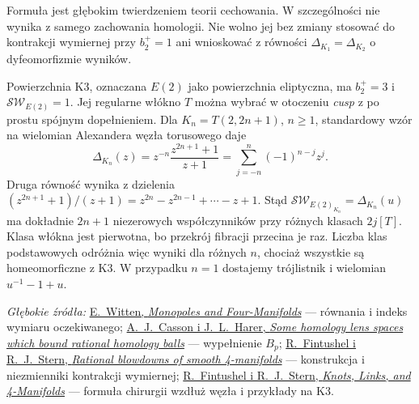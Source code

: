 Formuła jest głębokim twierdzeniem teorii cechowania.
W szczególności nie wynika z samego zachowania homologii.
Nie wolno jej bez zmiany stosować do kontrakcji wymiernej
przy $b_2^+=1$ ani wnioskować z równości
$\Delta_{K_1}=\Delta_{K_2}$ o dyfeomorfizmie wyników.

\begin{przyklad}
\label{prz:ks-k3-cztery}
Powierzchnia K3, oznaczana $E(2)$ jako powierzchnia
eliptyczna, ma $b_2^+=3$ i $\mathcal{SW}_{E(2)}=1$.
Jej regularne włókno $T$ można wybrać w otoczeniu
\emph{cusp} z po prostu spójnym dopełnieniem.
Dla $K_n=T(2,2n+1)$, $n\geq1$, standardowy wzór
na wielomian Alexandera węzła torusowego daje
\[
 \Delta_{K_n}(z)=z^{-n}\frac{z^{2n+1}+1}{z+1}
 =\sum_{j=-n}^{n}(-1)^{n-j}z^j.
\]
Druga równość wynika z dzielenia
$(z^{2n+1}+1)/(z+1)=z^{2n}-z^{2n-1}+\cdots-z+1$.
Stąd $\mathcal{SW}_{E(2)_{K_n}}=\Delta_{K_n}(u)$
ma dokładnie $2n+1$ niezerowych współczynników
przy różnych klasach $2j[T]$. Klasa włókna jest
pierwotna, bo przekrój fibracji przecina je raz.
Liczba klas podstawowych odróżnia więc wyniki
dla różnych $n$, chociaż wszystkie są homeomorficzne
z K3. W przypadku $n=1$ dostajemy trójlistnik
i wielomian $u^{-1}-1+u$.
\end{przyklad}

\par\smallskip
{\footnotesize\noindent\emph{Głębokie źródła:}
\href{https://arxiv.org/abs/hep-th/9411102}
{E.\ Witten, \emph{Monopoles and Four-Manifolds}} ---
równania i indeks wymiaru oczekiwanego;
\href{https://msp.org/pjm/1981/96-1/pjm-v96-n1-p03-s.pdf}
{A.\ J.\ Casson i J.\ L.\ Harer, \emph{Some homology lens
spaces which bound rational homology balls}} --- wypełnienie $B_p$;
\href{https://arxiv.org/abs/alg-geom/9505018}
{R.\ Fintushel i R.\ J.\ Stern, \emph{Rational blowdowns
of smooth 4-manifolds}} --- konstrukcja i niezmienniki
kontrakcji wymiernej;
\href{https://arxiv.org/abs/dg-ga/9612014}
{R.\ Fintushel i R.\ J.\ Stern, \emph{Knots, Links,
and 4-Manifolds}} --- formuła chirurgii wzdłuż węzła
i przykłady na K3.\par}

